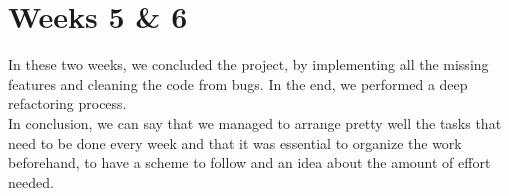 \section{Weeks 5 \& 6}
In these two weeks, we concluded the project, by implementing all the missing features and cleaning the code from bugs. In the end, we performed a deep refactoring process.\\
In conclusion, we can say that we managed to arrange pretty well the tasks that need to be done every week and that it was essential to organize the work beforehand, to have a scheme to follow and an idea about the amount of effort needed.
